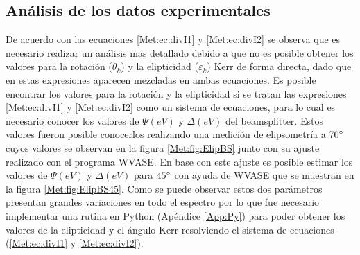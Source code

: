 \subsection{An\'alisis de los datos experimentales} \label{Met:subsec:AnExp}
 De acuerdo con las ecuaciones \ref{Met:ec:divI1} y \ref{Met:ec:divI2} se observa que es necesario realizar un an\'alisis mas detallado debido a que no es posible obtener los valores  para la rotaci\'on ($\theta_k$) y la elipticidad ($\varepsilon_k$) Kerr de forma directa, dado  que en estas expresiones aparecen mezcladas en ambas ecuaciones. Es posible encontrar los valores para la rotaci\'on  y la elipticidad si se tratan las expresiones \ref{Met:ec:divI1} y \ref{Met:ec:divI2} como un sistema de ecuaciones, para lo cual es necesario conocer los valores de $\varPsi (eV)$ y $\Delta (eV)$ del beamsplitter. Estos valores fueron posible conocerlos realizando una medici\'on de elipsometr\'ia a $70\degree$ cuyos valores se observan en la figura \ref{Met:fig:ElipBS} junto con su ajuste realizado con el programa WVASE. En base con este ajuste es posible estimar los valores de $\varPsi (eV)$ y $\Delta (eV)$ para $45 \degree$ con ayuda de WVASE que se muestran en la figura \ref{Met:fig:ElipBS45}. Como se puede observar estos dos par\'ametros presentan grandes variaciones en todo el espectro  por lo que fue necesario implementar una rutina en Python (Ap\'endice \ref{App:Py}) para poder obtener  los valores de la elipticidad  y el \'angulo Kerr resolviendo el sistema de ecuaciones (\ref{Met:ec:divI1} y \ref{Met:ec:divI2}).
